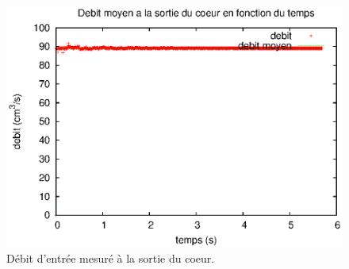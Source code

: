 \documentclass{config}
\begin{document}
\begin{figure}[H]
\centering
\includegraphics[scale=1]{Q.eps}
\caption{Débit d'entrée mesuré à la sortie du coeur.}
\label{debit_entree}
\end{figure}
\end{document}

